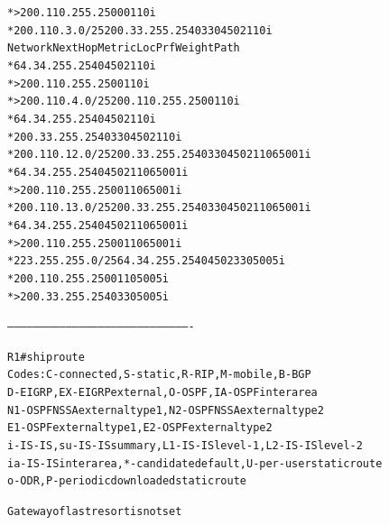 \documentclass[12pt,twoside,a4paper]{report}
\begin{document}
{\begin{small}
\begin{alltt}
*>                  200.110.255.250          0             0 110 i
*  200.110.3.0/25   200.33.255.254                         0 330 4502 110 i
   Network          Next Hop            Metric LocPrf Weight Path
*                   64.34.255.254                          0 4502 110 i
*>                  200.110.255.250                        0 110 i
*> 200.110.4.0/25   200.110.255.250                        0 110 i
*                   64.34.255.254                          0 4502 110 i
*                   200.33.255.254                         0 330 4502 110 i
*  200.110.12.0/25  200.33.255.254                         0 330 4502 110 65001 i
*                   64.34.255.254                          0 4502 110 65001 i
*>                  200.110.255.250                        0 110 65001 i
*  200.110.13.0/25  200.33.255.254                         0 330 4502 110 65001 i
*                   64.34.255.254                          0 4502 110 65001 i
*>                  200.110.255.250                        0 110 65001 i
*  223.255.255.0/25 64.34.255.254                          0 4502 330 5005 i
*                   200.110.255.250                        0 110 5005 i
*>                  200.33.255.254                         0 330 5005 i


-------------------------------------------------------------------------------------


R1#sh ip route            
Codes: C - connected, S - static, R - RIP, M - mobile, B - BGP
       D - EIGRP, EX - EIGRP external, O - OSPF, IA - OSPF inter area 
       N1 - OSPF NSSA external type 1, N2 - OSPF NSSA external type 2
       E1 - OSPF external type 1, E2 - OSPF external type 2
       i - IS-IS, su - IS-IS summary, L1 - IS-IS level-1, L2 - IS-IS level-2
       ia - IS-IS inter area, * - candidate default, U - per-user static route
       o - ODR, P - periodic downloaded static route

Gateway of last resort is not set


\end{alltt}
\end{small}}
\end{document}
